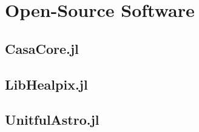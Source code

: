 \chapter{Open-Source Software}

\section{CasaCore.jl}

\section{LibHealpix.jl}

\section{UnitfulAstro.jl}


